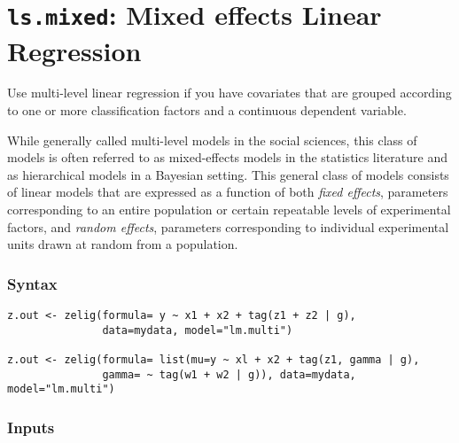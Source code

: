 \section{{\tt ls.mixed}: Mixed effects Linear Regression}
\label{mixed}

Use multi-level linear regression if you have covariates that are grouped according to one or more classification factors and a continuous dependent variable.

While generally called multi-level models in the social sciences, this class of models is often referred to as mixed-effects models in the statistics literature and as hierarchical models in a Bayesian setting. This general class of models consists of linear models that are expressed as a function of both \emph{fixed effects}, parameters corresponding to an entire population or certain repeatable levels of experimental factors, and \emph{random effects}, parameters corresponding to individual experimental units drawn at random from a population.

\subsubsection{Syntax}

\begin{verbatim}
z.out <- zelig(formula= y ~ x1 + x2 + tag(z1 + z2 | g),
               data=mydata, model="lm.multi")

z.out <- zelig(formula= list(mu=y ~ xl + x2 + tag(z1, gamma | g),
               gamma= ~ tag(w1 + w2 | g)), data=mydata, model="lm.multi")
\end{verbatim}

\subsubsection{Inputs}

